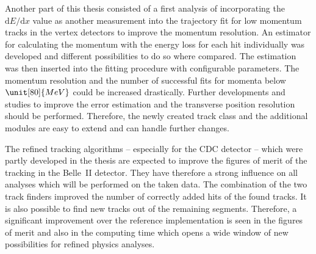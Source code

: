 Another part of this thesis consisted of a first analysis of incorporating the $\mathrm dE/\mathrm d x$ value as another measurement into the trajectory fit for low momentum tracks in the vertex detectors to improve the momentum resolution. An estimator for calculating the momentum with the energy loss for each hit individually was developed and different possibilities to do so where compared. The estimation was then inserted into the fitting procedure with configurable parameters. The momentum resolution and the number of successful fits for momenta below $\unit[80]{MeV}$ could be increased drastically. Further developments and studies to improve the error estimation and the transverse position resolution should be performed. Therefore, the newly created track class and the additional modules are easy to extend and can handle further changes.


The refined tracking algorithms -- especially for the CDC detector -- which were partly developed in the thesis are expected to improve the figures of merit of the tracking in the Belle~II detector. They have therefore a strong influence on all analyses which will be performed on the taken data. The combination of the two track finders improved the number of correctly added hits of the found tracks. It is also possible to find new tracks out of the remaining segments. Therefore, a significant improvement over the reference implementation is seen in the figures of merit and also in the computing time which opens a wide window of new possibilities for refined physics analyses.